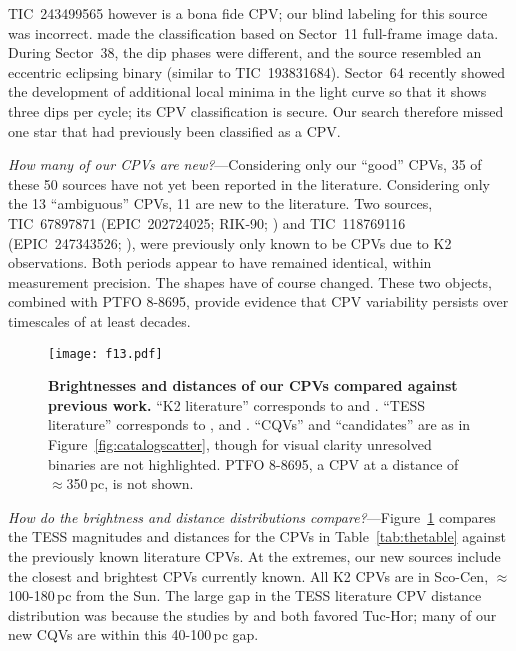 \documentclass[11pt,twocolumn,tighten,linenumbers]{aastex63}
\begin{document}
TIC~243499565 however is a bona fide CPV; our blind labeling for this
source was incorrect.  \citet{2021AJ....161...60S} made the
classification based on Sector~11 full-frame image data.  During
Sector~38, the dip phases were different, and the source
resembled an eccentric eclipsing binary (similar to TIC~193831684).  Sector~64 recently showed
the development of additional local minima in the light curve so that
it shows three dips per cycle; its CPV classification is secure.  Our
search therefore missed one star that had previously been classified
as a CPV.

{\it How many of our CPVs are new?}---Considering only our ``good''
CPVs, 35 of these 50 sources have not yet been reported in the
literature.  Considering only the 13 ``ambiguous'' CPVs, 11 are new to
the literature.  Two sources, TIC~67897871 (EPIC~202724025; RIK-90;
\citealt{2017AJ....153..152S}) and TIC~118769116 (EPIC~247343526;
\citealt{2017AJ....153..152S}), were previously only known to be CPVs
due to K2 observations.  Both periods appear to have remained
identical, within measurement precision.  The shapes have of course changed.
These two objects, combined with PTFO 8-8695, provide evidence
that CPV variability persists over timescales of at least decades.


\begin{figure}[!t]
	\begin{center}
		\centering
		\texttt{[image: f13.pdf]}
		\vspace{-0.2cm}
		\caption{
			{\bf Brightnesses and distances of our CPVs compared
      against previous work.}  
      ``K2 literature'' corresponds to \citet{2017AJ....153..152S} and
      \citet{2018AJ....155...63S}.  ``TESS literature'' corresponds to
      \citet{2019ApJ...876..127Z,2021AJ....161...60S,2022AJ....163..144G}, and \citet{2023ApJ...945..114P}.
      ``CQVs'' and ``candidates'' are as in
      Figure~\ref{fig:catalogscatter}, though for visual clarity
      unresolved binaries are not highlighted.  PTFO 8-8695, a CPV at
      a distance of $\approx$350\,pc, is not shown.
		}
			\vspace{-0.5cm}
		\label{fig:tmagvsdist}
	\end{center}
\end{figure}



{\it How do the brightness and distance distributions
compare?}---Figure~\ref{fig:tmagvsdist} compares the TESS magnitudes
and distances for the CPVs in Table~\ref{tab:thetable} against the
previously known literature CPVs.  At the extremes, our new sources
include the closest and brightest CPVs currently known. 
All K2 CPVs are in Sco-Cen,
$\approx$100-180\,pc from the Sun.  The large gap in the TESS literature CPV
distance distribution was because the studies by
\citep{2019ApJ...876..127Z} and \citet{2023ApJ...945..114P} both
favored Tuc-Hor; many of our new CQVs are within this 40-100\,pc gap.
\end{document}
